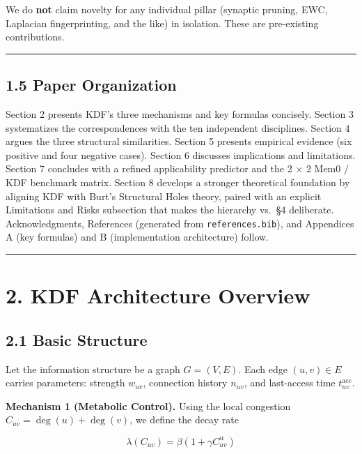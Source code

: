 We do \textbf{not} claim novelty for any individual pillar (synaptic pruning, EWC, Laplacian fingerprinting, and the like) in isolation. These are pre-existing contributions.

\begin{center}\rule{0.5\linewidth}{0.5pt}\end{center}

\subsection{1.5 Paper Organization}\label{paper-organization}

Section 2 presents KDF's three mechanisms and key formulas concisely. Section 3 systematizes the correspondences with the ten independent disciplines. Section 4 argues the three structural similarities. Section 5 presents empirical evidence (six positive and four negative cases). Section 6 discusses implications and limitations. Section 7 concludes with a refined applicability predictor and the 2 × 2 Mem0 / KDF benchmark matrix. Section 8 develops a stronger theoretical foundation by aligning KDF with Burt's Structural Holes theory, paired with an explicit Limitations and Risks subsection that makes the hierarchy vs.~§4 deliberate. Acknowledgments, References (generated from \texttt{references.bib}), and Appendices A (key formulas) and B (implementation architecture) follow.

\begin{center}\rule{0.5\linewidth}{0.5pt}\end{center}

\section{2. KDF Architecture Overview}\label{kdf-architecture-overview}

\subsection{2.1 Basic Structure}\label{basic-structure}

Let the information structure be a graph \(G = (V, E)\). Each edge \((u, v) \in E\) carries parameters: strength \(w_{uv}\), connection history \(n_{uv}\), and last-access time \(t^{\text{acc}}_{uv}\).

\textbf{Mechanism 1 (Metabolic Control).} Using the local congestion \(C_{uv} = \deg(u) + \deg(v)\), we define the decay rate

\[
\lambda(C_{uv}) = \beta \left( 1 + \gamma C_{uv}^{\alpha} \right)
\]

